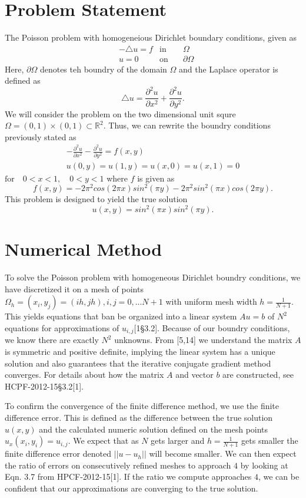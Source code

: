 \documentclass[11pt]{article}
\begin{document}
\section{Problem Statement}
The Poisson problem with homogeneious Dirichlet boundary conditions, given as
\begin{align*}
&-\triangle u=f &\text{in}\hspace{1em}& \Omega\\
&u=0            &\text{on}\hspace{1em}& \partial\Omega
\end{align*}
Here, $\partial\Omega$ denotes teh boundry of the domain $\Omega$ and the Laplace operator is defined as
$$\triangle u=\frac{\partial ^2 u}{\partial x^2}+\frac{\partial ^2 u}{\partial y^2}.$$
We will consider the problem on the two dimensional unit squre $\Omega=(0,1)\times (0,1)\subset \mathbb{R}^2$. Thus, we can rewrite the boundry conditions previously stated as
\begin{align*}
&-\frac{\partial ^2 u}{\partial x^2}-\frac{\partial ^2 u}{\partial y^2}=f(x,y)&\\
&u(0,y)=u(1,y)=u(x,0)=u(x,1)=0 &
\end{align*}
$\text{for}\hspace{1em} 0<x<1,\hspace{1em} 0<y<1$ where $f$ is given as
$$f(x,y)=-2\pi ^2 cos(2\pi x)sin^2 (\pi y)-2\pi ^2 sin^2(\pi x)cos(2\pi y).$$
This problem is designed to yield the true solution
$$u(x,y)=sin^2 (\pi x)sin^2 (\pi y).$$
\section{Numerical Method}
To solve the Poisson problem with homogeneous Dirichlet boundry conditions, we have discretized it on a mesh of points $\Omega_h ={(x_i, y_j)=(ih,jh),i,j=0,...N+1}$ with uniform mesh width $h=\frac{1}{N+1}$. This yields equations that ban be organized into a linear system $Au=b$ of $N^2$ equations for approximations of $u_{i,j}$[1\S 3.2]. Because of our boundry conditions, we know there are exactly $N^2$ unknowns. From [5,14] we understand the matrix $A$ is symmetric and positive definite, implying the linear system has a unique solution and also guarantees that the iterative conjugate gradient method converges. For details about how the matrix $A$ and vector $b$ are constructed, see HCPF-2012-15\S3.2[1].

To confirm the convergence of the finite difference method, we use the finite difference error. This is defined as the difference between the true solution $u(x,y)$ and the calculated numeric solution defined on the mesh points $u_x(x_i,y_i)=u_{i,j}$. We expect that as $N$ gets larger and $h=\frac{1}{N+1}$ gets smaller the finite difference error denoted $||u-u_h||$ will become smaller. We can then expect the ratio of errors on consecutively refined meshes to approach $4$ by looking at Eqn. 3.7 from HPCF-2012-15[1]. If the ratio we compute approaches $4$, we can be confident that our approximations are converging to the true solution.
\end{document}
